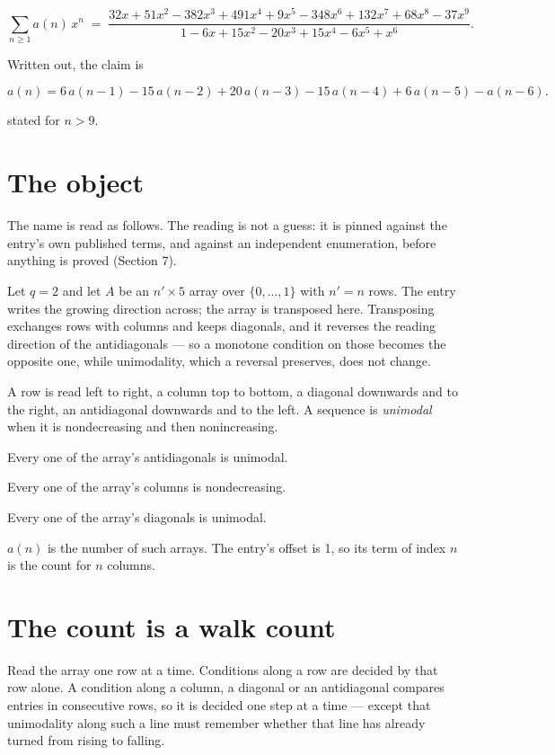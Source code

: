 \documentclass[11pt]{article}
\theoremstyle{definition}
\begin{document}
\[\sum_{n \ge 1} a(n)\,x^n \;=\; \frac{32x + 51x^{2} - 382x^{3} + 491x^{4} + 9x^{5} - 348x^{6} + 132x^{7} + 68x^{8} - 37x^{9}}{1 - 6x + 15x^{2} - 20x^{3} + 15x^{4} - 6x^{5} + x^{6}}.\]

Written out, the claim is

\[a(n) = 6\,a(n-1) - 15\,a(n-2) + 20\,a(n-3) - 15\,a(n-4) + 6\,a(n-5) - a(n-6).\]

stated for $n > 9$.

\section{The object}

The name is read as follows. The reading is not a guess: it is pinned against the entry's own published terms, and against an independent enumeration, before anything is proved (Section 7).

Let $q = 2$ and let $A$ be an $n' \times 5$ array over $\{0,\dots,1\}$ with $n' = n$ rows. The entry writes the growing direction across; the array is transposed here. Transposing exchanges rows with columns and keeps diagonals, and it reverses the reading direction of the antidiagonals --- so a monotone condition on those becomes the opposite one, while unimodality, which a reversal preserves, does not change.

A row is read left to right, a column top to bottom, a diagonal downwards and to the right, an antidiagonal downwards and to the left. A sequence is {\itshape unimodal} when it is nondecreasing and then nonincreasing.

Every one of the array's antidiagonals is unimodal.

Every one of the array's columns is nondecreasing.

Every one of the array's diagonals is unimodal.

$a(n)$ is the number of such arrays. The entry's offset is 1, so its term of index $n$ is the count for $n$ columns.

\section{The count is a walk count}

Read the array one row at a time. Conditions along a row are decided by that row alone. A condition along a column, a diagonal or an antidiagonal compares entries in consecutive rows, so it is decided one step at a time --- except that unimodality along such a line must remember whether that line has already turned from rising to falling.
\end{document}
